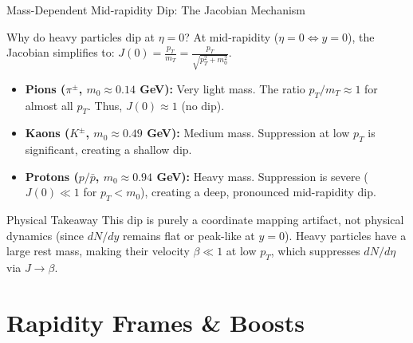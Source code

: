 \documentclass[aspectratio=169]{beamer}
\begin{document}
\begin{frame}{Mass-Dependent Mid-rapidity Dip: The Jacobian Mechanism}
    \begin{block}{Why do heavy particles dip at $\eta = 0$?}
        \footnotesize
        At mid-rapidity ($\eta = 0 \iff y = 0$), the Jacobian simplifies to: $J(0) = \frac{p_T}{m_T} = \frac{p_T}{\sqrt{p_T^2 + m_0^2}}$.
        \begin{itemize}
            \item \textbf{Pions ($\pi^\pm$, $m_0 \approx 0.14$ GeV):} Very light mass. The ratio $p_T/m_T \approx 1$ for almost all $p_T$. Thus, $J(0) \approx 1$ (no dip).
            \item \textbf{Kaons ($K^\pm$, $m_0 \approx 0.49$ GeV):} Medium mass. Suppression at low $p_T$ is significant, creating a shallow dip.
            \item \textbf{Protons ($p/\bar{p}$, $m_0 \approx 0.94$ GeV):} Heavy mass. Suppression is severe ($J(0) \ll 1$ for $p_T < m_0$), creating a deep, pronounced mid-rapidity dip.
        \end{itemize}
    \end{block}
    \begin{alertblock}{Physical Takeaway}
        This dip is purely a coordinate mapping artifact, not physical dynamics (since $dN/dy$ remains flat or peak-like at $y=0$). Heavy particles have a large rest mass, making their velocity $\beta \ll 1$ at low $p_T$, which suppresses $dN/d\eta$ via $J \to \beta$.
    \end{alertblock}
\end{frame}

\section{Rapidity Frames \& Boosts}
\end{document}
